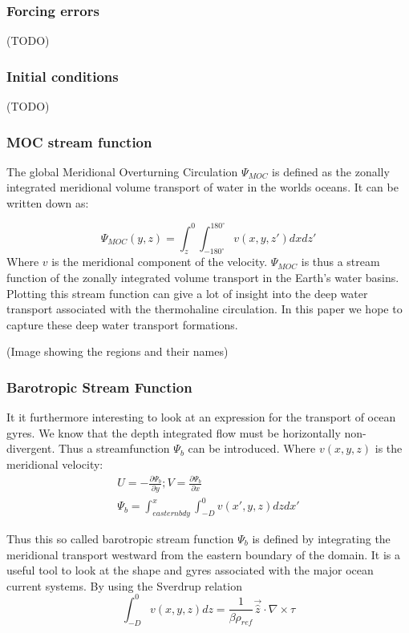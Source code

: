  \subsubsection{Forcing errors}
 (TODO)
 \subsubsection{Initial conditions}
 (TODO)
 
 \subsubsection{MOC stream function} \label{sec:MOCSTREAM}
 
 The global Meridional Overturning Circulation $\Psi_{MOC}$ is defined as the zonally integrated meridional volume transport of water in the worlds oceans. It can be written down as:
 
 $$
 \Psi_{MOC}(y,z) = \int_{z}^{0} \int_{-180^{\circ}}^{180^{\circ}} v(x,y,z') dx dz'
 $$
Where $v$ is the meridional component of the velocity.
$ \Psi_{MOC}$ is thus a stream function of the zonally integrated volume transport in the Earth's water basins. Plotting this stream function can give a lot of insight into the deep water transport associated with the thermohaline circulation. In this paper we hope to capture these deep water transport formations.

(Image showing the regions and their names)

\subsubsection{Barotropic Stream Function} \label{sec:BSF_theory}
It it furthermore interesting to look at an expression for the transport of ocean gyres. We know that the depth integrated flow must be horizontally non-divergent. Thus a streamfunction $\Psi_{b}$ can be introduced. Where $v(x,y,z)$ is the meridional velocity:
\begin{align}
U = -\frac{\partial \Psi_{b}}{\partial y}; V=\frac{\partial \Psi_{b}}{\partial x} \\
\Psi_{b} = \int_{eastern bdy}^{x} \int_{-D}^{0} v(x',y,z) dz dx'
\end{align}

Thus this so called barotropic stream function $\Psi_{b}$ is defined by integrating the meridional transport westward from the eastern boundary of the domain. It is a useful tool to look at the shape and gyres associated with the major ocean current systems. By using the Sverdrup relation
$$
\int_{-D}^{0}v(x,y,z) dz = \frac{1}{\beta \rho_{ref}}\vec{\hat{z}}\cdot \nabla \times \tau
$$

